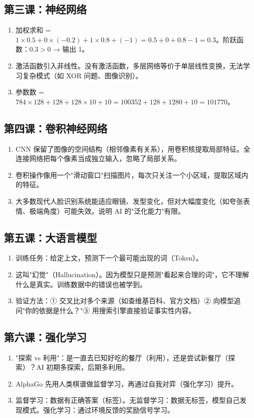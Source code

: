 \documentclass[a4paper,12pt]{ctexart}
\begin{document}
\subsection*{第三课：神经网络}
\begin{enumerate}
  \item 加权求和 = $1×0.5 + 0×(-0.2) + 1×0.8 + (-1) = 0.5 + 0 + 0.8 - 1 = 0.3$。阶跃函数：$0.3 > 0$ → 输出 1。
  \item 激活函数引入非线性。没有激活函数，多层网络等价于单层线性变换，无法学习复杂模式（如 XOR 问题、图像识别）。
  \item 参数数 = $784×128 + 128 + 128×10 + 10 = 100352 + 128 + 1280 + 10 = 101770$。
\end{enumerate}

\subsection*{第四课：卷积神经网络}
\begin{enumerate}
  \item CNN 保留了图像的空间结构（相邻像素有关系），用卷积核提取局部特征。全连接网络把每个像素当成独立输入，忽略了局部关系。
  \item 卷积操作像用一个"滑动窗口"扫描图片，每次只关注一个小区域，提取区域内的特征。
  \item 大多数现代人脸识别系统能适应眼镜、发型变化，但对大幅度变化（如夸张表情、极端角度）可能失效。说明 AI 的"泛化能力"有限。
\end{enumerate}

\subsection*{第五课：大语言模型}
\begin{enumerate}
  \item 训练任务：给定上文，预测下一个最可能出现的词（Token）。
  \item 这叫"幻觉"（Hallucination）。因为模型只是预测"看起来合理的词"，它不理解什么是真实。训练数据中的错误也被学到。
  \item 验证方法：① 交叉比对多个来源（如查维基百科、官方文档）② 向模型追问"你的依据是什么？"③ 用搜索引擎直接验证事实性内容。
\end{enumerate}

\subsection*{第六课：强化学习}
\begin{enumerate}
  \item "探索 vs 利用"：是一直去已知好吃的餐厅（利用），还是尝试新餐厅（探索）？AI 初期多探索，后期多利用。
  \item AlphaGo 先用人类棋谱做监督学习，再通过自我对弈（强化学习）提升。
  \item 监督学习：数据有正确答案（标签）。无监督学习：数据无标签，模型自己发现模式。强化学习：通过环境反馈的奖励信号学习。
\end{enumerate}
\end{document}
